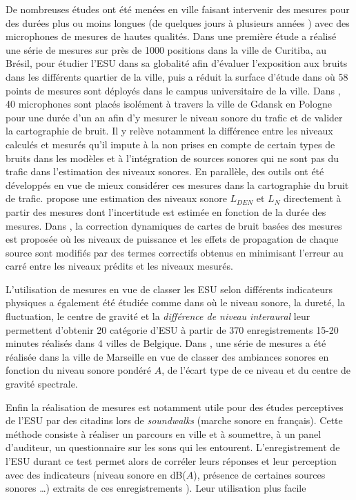 De nombreuses études ont été menées en ville faisant intervenir des mesures pour des durées plus ou moins longues (de quelques jours \cite{romeu2011street} à plusieurs années \cite{gaja2003sampling}) avec des microphones de mesures de hautes qualités. Dans une première étude \cite{zannin2002environmental} a réalisé une série de mesures sur près de 1000 positions dans la ville de Curitiba, au Brésil, pour étudier l'ESU dans sa globalité afin d'évaluer l'exposition aux bruits dans les différents quartier de la ville, puis a réduit la surface d'étude dans \cite{zannin_characterization_2013} où 58 points de mesures sont déployés dans le campus universitaire de la ville. 
Dans \cite{Mioduszewski}, 40 microphones sont placés isolément à travers la ville de Gdansk en Pologne pour une durée d'un an afin d'y mesurer le niveau sonore du trafic et de valider la cartographie de bruit. Il y relève notamment la différence entre les niveaux calculés et mesurés qu'il impute à la non prises en compte de certain types de bruits dans les modèles et à l'intégration de sources sonores qui ne sont pas du trafic dans l'estimation des niveaux sonores.
En parallèle, des outils ont été développés en vue de mieux considérer ces mesures dans la cartographie du bruit de trafic. \cite{makarewicz_empirical_2011} propose une estimation des niveaux sonore $L_{DEN}$ et $L_N$ directement à partir des mesures dont l'incertitude est estimée en fonction de la durée des mesures. Dans \cite{wei_dynamic_2016}, la correction dynamiques de cartes de bruit basées des mesures est proposée où les niveaux de puissance et les effets de propagation de chaque source sont modifiés par des termes correctifs obtenus en minimisant l'erreur au carré entre les niveaux prédits et les niveaux mesurés.

L'utilisation de mesures en vue de classer les ESU selon différents indicateurs physiques a également été étudiée comme dans \cite{rychtarikova2013soundscape} où le niveau sonore, la dureté, la fluctuation, le centre de gravité et la \textit{différence de niveau interaural} leur permettent d'obtenir 20 catégorie d'ESU à partir de 370 enregistrements 15-20 minutes réalisés dans 4 villes de Belgique. Dans \cite{can_describing_2015}, une série de mesures a été réalisée dans la ville de Marseille en vue de classer des ambiances sonores en fonction du niveau sonore pondéré $A$, de l'écart type de ce niveau et du centre de gravité spectrale. 

Enfin la réalisation de mesures est notamment utile pour des études perceptives de l'ESU par des citadins lors de \textit{soundwalks} (marche sonore en français). Cette méthode consiste à réaliser un parcours en ville et à soumettre, à un panel d'auditeur, un questionnaire sur les sons qui les entourent. L'enregistrement de l'ESU durant ce test permet alors de corréler leurs réponses et leur perception avec des indicateurs (niveau sonore en dB($A$), présence de certaines sources sonores \dots{}) extraits de ces enregistrements \cite{brocolini_measurements_2013, hong2013designing}). Leur utilisation plus facile \\ 


